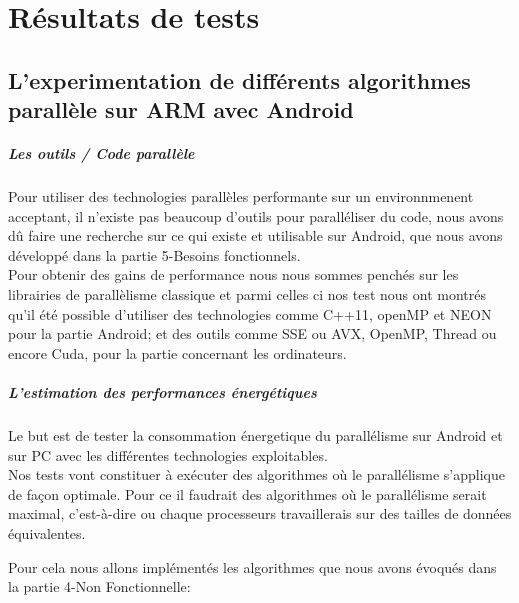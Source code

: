 \chapter{Résultats de tests}

\section{ L'experimentation de différents algorithmes parallèle sur ARM avec Android }

\paragraph{Les outils / Code parallèle \\}

	Pour utiliser des technologies parallèles performante sur un environnmenent acceptant, il n'existe pas beaucoup d'outils pour paralléliser du code, nous avons dû faire une recherche sur ce qui existe et utilisable sur Android, que nous avons développé dans la partie 5-Besoins fonctionnels. \\

	Pour obtenir des gains de performance nous nous sommes penchés sur les librairies de parallèlisme classique et parmi celles ci nos test nous ont montrés qu'il été possible d'utiliser des technologies comme C++11, openMP et NEON pour la partie Android; et des outils comme SSE ou AVX, OpenMP, Thread ou encore Cuda, pour la partie concernant les ordinateurs. \\

\paragraph{L'estimation des performances énergétiques \\}

	Le but est de tester la consommation énergetique du parallélisme sur Android et sur PC avec les différentes technologies exploitables. \\

	Nos tests vont constituer à exécuter des algorithmes où le parallélisme s'applique de façon optimale. Pour ce il faudrait des algorithmes où le parallélisme serait maximal, c'est-à-dire ou chaque processeurs travaillerais sur des tailles de données équivalentes.

	Pour cela nous allons implémentés les algorithmes que nous avons évoqués dans la partie 4-Non Fonctionnelle: